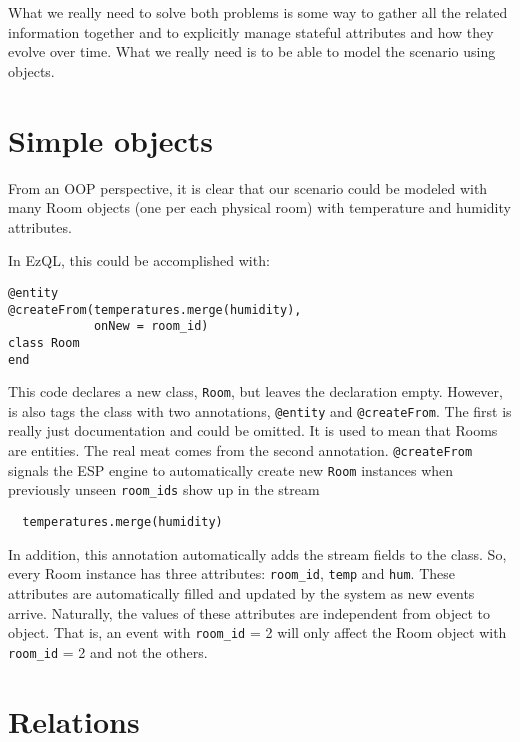 \documentclass{report}
\begin{document}
What we really need to solve both problems is some way to gather all
the related information together and to explicitly manage stateful
attributes and how they evolve over time. What we really need is to be
able to model the scenario using objects.

\section{Simple objects}

From an OOP perspective, it is clear that our scenario could be
modeled with many Room objects (one per each physical room) with
temperature and humidity attributes.

In EzQL, this could be accomplished with:

\begin{verbatim}
@entity
@createFrom(temperatures.merge(humidity),
            onNew = room_id)
class Room
end
\end{verbatim}

This code declares a new class, \verb=Room=, but leaves the
declaration empty. However, is also tags the class with two
annotations, \verb=@entity= and \verb=@createFrom=. The first is
really just documentation and could be omitted. It is used to mean
that Rooms are entities. The real meat comes from the second
annotation. \verb=@createFrom= signals the ESP engine to automatically
create new \verb=Room= instances when previously unseen
\verb=room_ids= show up in the stream

\begin{verbatim}
  temperatures.merge(humidity)
\end{verbatim}

In addition, this annotation automatically adds the stream fields to
the class. So, every Room instance has three attributes:
\verb=room_id=, \verb=temp= and \verb=hum=. These attributes are
automatically filled and updated by the system as new events
arrive. Naturally, the values of these attributes are independent from
object to object. That is, an event with \verb=room_id= = 2 will only
affect the Room object with \verb=room_id= = 2 and not the others.


\section{Relations}
\end{document}
